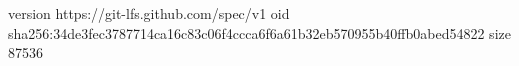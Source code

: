 version https://git-lfs.github.com/spec/v1
oid sha256:34de3fec3787714ca16c83c06f4ccca6f6a61b32eb570955b40ffb0abed54822
size 87536

